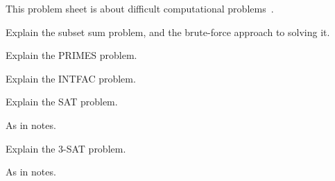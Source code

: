 

\noindent
This problem sheet is about difficult computational problems~\cite{sipserbook}.

\begin{questions}


\question
Explain the subset sum problem, and the brute-force approach to solving it.

\question
Explain the PRIMES problem.

\question
Explain the INTFAC problem.

\question
Explain the SAT problem.
\begin{solution}
As in notes.
\end{solution}

\question
Explain the 3-SAT problem.
\begin{solution}
As in notes.
\end{solution}





\end{questions}
